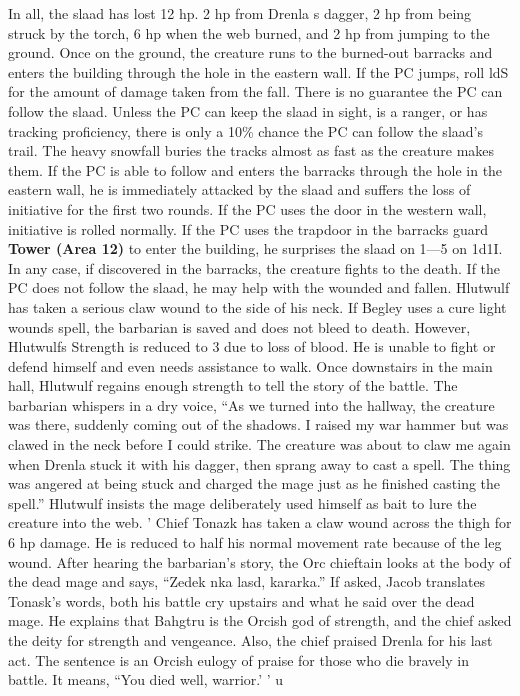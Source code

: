\documentclass[a5paper,11pt,twoside]{book}
\newcommand{\MapText}[1]{
	{\color{DarkCyan} \textbf{#1}}
}
\begin{document}
{{{{{In all, the slaad has lost 12 hp.
2 hp from Drenla s dagger, 2 hp from being struck by the torch, 6 hp when the web burned, and 2 hp from jumping to the ground.
Once on the ground, the creature runs to the burned-out barracks and enters the building through the hole in the eastern wall.
If the PC jumps, roll ldS for the amount of damage taken from the fall.
There is no guarantee the PC can follow the slaad.
Unless the PC can keep the slaad in sight, is a ranger, or has tracking proficiency, there is only a 10\% chance the PC can follow the slaad’s trail.
The heavy snowfall buries the tracks almost as fast as the creature makes them.
If the PC is able to follow and enters the barracks through the hole in the eastern wall, he is immediately attacked by the slaad and suffers the loss of initiative for the first two rounds.
If the PC uses the door in the western wall, initiative is rolled normally.
If the PC uses the trapdoor in the barracks guard \MapText{Tower (Area 12)} to enter the building, he surprises the slaad on 1—5 on 1d1I}.
In any case, if discovered in the barracks, the creature fights to the death.
If the PC does not follow the slaad, he may help with the wounded and fallen.
Hlutwulf has taken a serious claw wound to the side of his neck.
If Begley uses a cure light wounds spell, the barbarian is saved and does not bleed to death.
However, Hlutwulfs Strength is reduced to 3 due to loss of blood.
He is unable to fight or defend himself and even needs assistance to walk.
Once downstairs in the main hall, Hlutwulf regains enough strength to tell the story of the battle.
The barbarian whispers in a dry voice, “As we turned  into the hallway, the creature was there, suddenly coming out of the shadows.
I raised my war hammer but was clawed in the neck before I could strike.
The creature was about to claw me again when Drenla stuck it with his dagger, then sprang away to cast a spell.
The thing was angered at being stuck and charged the mage just as he finished casting the spell.” Hlutwulf insists the mage deliberately used himself as bait to lure the creature into the web.
' Chief Tonazk has taken a claw wound across the thigh for 6 hp damage.
He is reduced to half his normal movement rate because of the leg wound.
After hearing the barbarian’s story, the Orc chieftain looks at the body of the dead mage and says, “Zedek nka lasd, kararka.” If asked, Jacob translates Tonask’s words, both his battle cry upstairs and what he said over the dead mage.
He explains that Bahgtru is the Orcish god of strength, and the chief asked the deity for strength and vengeance.
Also, the chief praised Drenla for his last act.
The sentence is an Orcish eulogy of praise for those who die bravely in battle.
It means, “You died well, warrior.’ ’ u
}}}}
\end{document}
